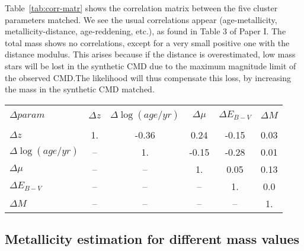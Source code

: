 \documentclass{aa}
\begin{document}
\begin{appendix}
Table~\ref{tab:corr-matr} shows the correlation matrix between the five cluster
parameters matched. We see the usual correlations appear (age-metallicity,
metallicity-distance, age-reddening, etc.), as found in Table 3 of Paper I. The
total mass shows no correlations, except for a very small positive one with the
distance modulus. This arises because if the distance is overestimated, low mass
stars will be lost in the synthetic CMD due to the maximum magnitude limit of
the observed CMD.\@ The likelihood will thus compensate this loss, by increasing
the mass in the synthetic CMD matched.

\begin{table*}
\centering
\caption{Correlation matrix for parameter deltas, defined for each cluster in
the sense \texttt{ASteCA} minus MASSCLEAN.}
\label{tab:corr-matr}
\begin{tabular}{lccccc}
\hline
\hline\\[-1.85ex]
$\Delta param$ & $\Delta z$ & $\Delta \log(age/yr)$ & $\Delta \mu$ &
$\Delta E_{B-V}$ & $\Delta M$ \\
\hline\\[-1.85ex]
$\Delta z$            &  1. & -0.36 & 0.24  & -0.15 & 0.03 \\
$\Delta \log(age/yr)$ &  -- & 1.    & -0.15 & -0.28 & 0.01 \\
$\Delta \mu$          &  -- & --    & 1.    & 0.05  & 0.13 \\
$\Delta E_{B-V}$      &  -- & --    & --    & 1.    & 0.0\\
$\Delta M$            &  -- & --    & --    & --    & 1. \\
\hline
\end{tabular}
\end{table*}




\subsection{Metallicity estimation for different mass values}
\label{apdx:ssec:metallicity}


\end{appendix}
\end{document}
